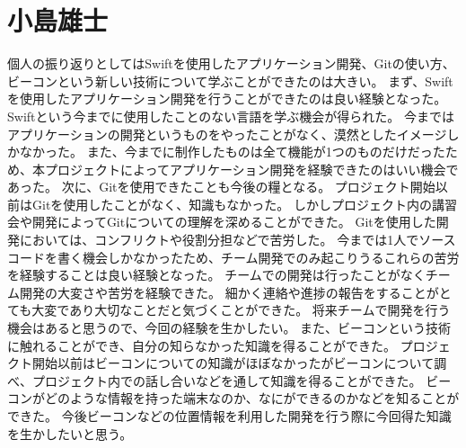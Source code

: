 \documentclass[openany,11pt,papersize]{jsbook}
\begin{document}

\section{小島雄士}
個人の振り返りとしてはSwiftを使用したアプリケーション開発、Gitの使い方、ビーコンという新しい技術について学ぶことができたのは大きい。
まず、Swiftを使用したアプリケーション開発を行うことができたのは良い経験となった。
Swiftという今までに使用したことのない言語を学ぶ機会が得られた。
今まではアプリケーションの開発というものをやったことがなく、漠然としたイメージしかなかった。
また、今までに制作したものは全て機能が1つのものだけだったため、本プロジェクトによってアプリケーション開発を経験できたのはいい機会であった。
次に、Gitを使用できたことも今後の糧となる。
プロジェクト開始以前はGitを使用したことがなく、知識もなかった。
しかしプロジェクト内の講習会や開発によってGitについての理解を深めることができた。
Gitを使用した開発においては、コンフリクトや役割分担などで苦労した。
今までは1人でソースコードを書く機会しかなかったため、チーム開発でのみ起こりうるこれらの苦労を経験することは良い経験となった。
チームでの開発は行ったことがなくチーム開発の大変さや苦労を経験できた。
細かく連絡や進捗の報告をすることがとても大変であり大切なことだと気づくことができた。
将来チームで開発を行う機会はあると思うので、今回の経験を生かしたい。
また、ビーコンという技術に触れることができ、自分の知らなかった知識を得ることができた。
プロジェクト開始以前はビーコンについての知識がほぼなかったがビーコンについて調べ、プロジェクト内での話し合いなどを通して知識を得ることができた。
ビーコンがどのような情報を持った端末なのか、なにができるのかなどを知ることができた。
今後ビーコンなどの位置情報を利用した開発を行う際に今回得た知識を生かしたいと思う。
\end{document}

